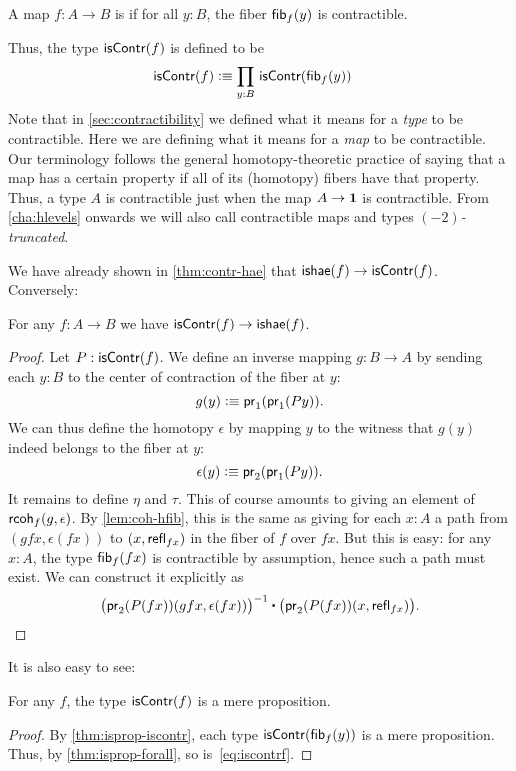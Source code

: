 \begin{defn} \label{defn:equivalence}
  A map $f:A\to B$ is 
  if for all $y:B$, the fiber ${\mathsf{fib}}_{f}(y)$ is contractible.
\end{defn}

Thus, the type $\mathsf{isContr}(f)$ is defined to be
\begin{align}
  \iscontr(f) &\defeq \prd{y:B} \iscontr(\hfib f y)\label{eq:iscontrf}
\end{align}
Note that in \cref{sec:contractibility} we defined what it means for a \emph{type} to be contractible.
Here we are defining what it means for a \emph{map} to be contractible.
Our terminology follows the general homotopy-theoretic practice of saying that a map has a certain property if all of its (homotopy) fibers have that property.
Thus, a type $A$ is contractible just when the map $A\to\mathbf{1}$ is contractible.
From \cref{cha:hlevels} onwards we will also call contractible maps and types \emph{$(-2)$-truncated}.

We have already shown in \cref{thm:contr-hae} that $\mathsf{ishae}(f) \to \mathsf{isContr}(f)$.
Conversely:

\begin{thm}\label{thm:lequiv-contr-hae}
For any $f:A\to B$ we have ${\mathsf{isContr}(f)} \to {\ensuremath{\mathsf{ishae}}(f)}$.
\end{thm}
\begin{proof}
Let $P : \mathsf{isContr}(f)$. We define an inverse mapping $g : B \to A$ by sending each $y : B$ to the center of contraction of the fiber at $y$:
\[ g(y) \vcentcolon\equiv \mathsf{pr}_{1}(\mathsf{pr}_{1}(Py)). \]
We can thus define the homotopy $\epsilon$ by mapping $y$ to the witness that $g(y)$ indeed belongs to the fiber at $y$:
\[ \epsilon(y) \vcentcolon\equiv \mathsf{pr}_{2}(\mathsf{pr}_{1}(P y)). \]
It remains to define $\eta$ and $\tau$. This of course amounts to giving an element of $\mathsf{rcoh}_{f}(g,\epsilon)$. By \cref{lem:coh-hfib}, this is the same as giving for each $x:A$ a path from $(gfx,\epsilon(fx))$ to $(x,\mathsf{refl}_{fx})$ in the fiber of $f$ over $fx$. But this is easy: for any $x : A$, the type ${\mathsf{fib}}_{f}(fx)$
is contractible by assumption, hence such a path must exist. We can construct it explicitly as
\[\opp{\big(\proj{2}(P(fx))(gfx,\epsilon(fx))\big)} \ct \big(\proj{2}(P(fx)) (x,\refl{fx})\big). \qedhere \]
\end{proof}

It is also easy to see:

\begin{lem}\label{thm:contr-hprop}
  For any $f$, the type $\mathsf{isContr}(f)$ is a mere proposition.
\end{lem}
\begin{proof}
  By \cref{thm:isprop-iscontr}, each type $\mathsf{isContr} ({\mathsf{fib}}_{f}(y))$ is a mere proposition.
  Thus, by \cref{thm:isprop-forall}, so is~\eqref{eq:iscontrf}.
\end{proof}

